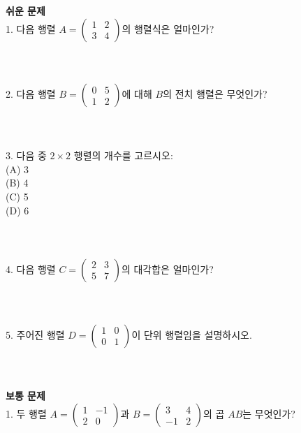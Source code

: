 \documentclass[fleqn]{article}
\begin{document}
      
        \noindent \textbf{쉬운 문제} \\

1. 다음 행렬 \( A = \begin{pmatrix} 1 & 2 \\ 3 & 4 \end{pmatrix} \)의 행렬식은 얼마인가? \\ 
\\\\\\

2. 다음 행렬 \( B = \begin{pmatrix} 0 & 5 \\ 1 & 2 \end{pmatrix} \)에 대해 \( B \)의 전치 행렬은 무엇인가? \\ 
\\\\\\

3. 다음 중 \( 2 \times 2 \) 행렬의 개수를 고르시오: \\
   (A) 3 \\ 
   (B) 4 \\ 
   (C) 5 \\ 
   (D) 6 \\ 
\\\\\\

4. 다음 행렬 \( C = \begin{pmatrix} 2 & 3 \\ 5 & 7 \end{pmatrix} \)의 대각합은 얼마인가? \\ 
\\\\\\

5. 주어진 행렬 \( D = \begin{pmatrix} 1 & 0 \\ 0 & 1 \end{pmatrix} \)이 단위 행렬임을 설명하시오. \\ 
\\\\\\

\noindent \textbf{보통 문제} \\

1. 두 행렬 \( A = \begin{pmatrix} 1 & -1 \\ 2 & 0 \end{pmatrix} \)과 \( B = \begin{pmatrix} 3 & 4 \\ -1 & 2 \end{pmatrix} \)의 곱 \( AB \)는 무엇인가? \\ 
\\\\\\
\end{document}
